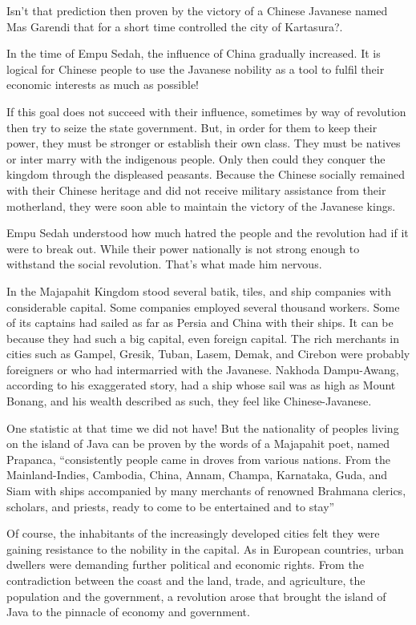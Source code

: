 Isn't that prediction then proven by the victory of a Chinese Javanese 
named Mas Garendi that for a short time controlled the city of Kartasura?.\vskip 0.2in

In the time of Empu Sedah, the influence of China gradually increased.
It is logical for Chinese people to use the Javanese nobility as a tool to fulfil 
their economic interests as much as possible!\vskip 0.2in

If this goal does not succeed with their influence, sometimes by way of revolution then 
try to seize the state government. But, in order for them to keep their power, they must be 
stronger or establish their own class. They must be natives or inter marry with the indigenous 
people. Only then could they conquer the kingdom through the displeased peasants. Because the 
Chinese socially remained with their Chinese heritage and did not receive military assistance 
from their motherland, they were soon able to maintain the victory of the Javanese kings.\vskip 0.2in

Empu Sedah understood how much hatred the people and the revolution had if it were to break 
out. While their power nationally is not strong enough to withstand the social revolution. That's what made him nervous.\vskip 0.2in

In the Majapahit Kingdom stood several batik, tiles, and ship companies with considerable capital. 
Some companies employed several thousand workers. Some of its captains had sailed as far as Persia 
and China with their ships. It can be because they had such a big capital, even foreign capital. 
The rich merchants in cities such as Gampel, Gresik, Tuban, Lasem, Demak, and Cirebon were probably 
foreigners or who had intermarried with the Javanese. Nakhoda Dampu-Awang, according to his exaggerated 
story, had a ship whose sail was as high as Mount Bonang, and his wealth described as such, they feel like Chinese-Javanese.\vskip 0.2in

One statistic at that time we did not have! But the nationality of peoples living on the island of Java can 
be proven by the words of a Majapahit poet, named Prapanca, “consistently people came in droves from various nations. 
From the Mainland-Indies, Cambodia, China, Annam, Champa, Karnataka, Guda, and Siam with ships accompanied by many merchants of 
renowned Brahmana clerics, scholars, and priests, ready to come to be entertained and to stay”\vskip 0.2in

Of course, the inhabitants of the increasingly developed cities felt they were gaining resistance to the nobility in 
the capital. As in European countries, urban dwellers were demanding further political and economic rights. From 
the contradiction between the coast and the land, trade, and agriculture, the population and the government, 
a revolution arose that brought the island of Java to the pinnacle of economy and government.\vskip 0.2in

